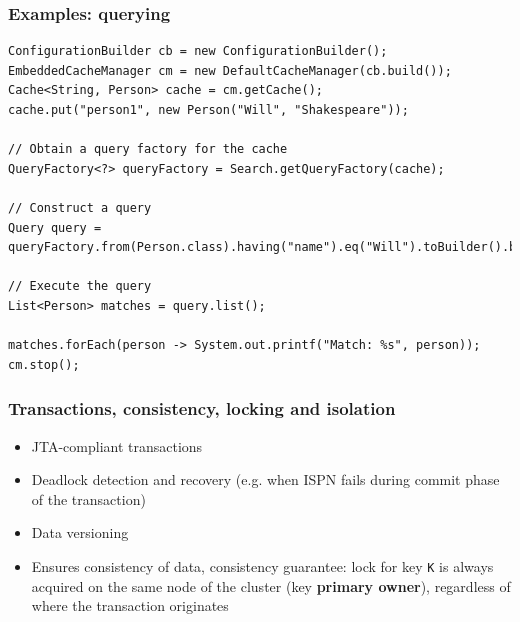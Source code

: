 \documentclass[10pt,utf8]{beamer}
\begin{document}
\begin{frame}[fragile]
	\frametitle{Examples: querying}
		\begin{lstlisting}[style=Java]
ConfigurationBuilder cb = new ConfigurationBuilder();
EmbeddedCacheManager cm = new DefaultCacheManager(cb.build());
Cache<String, Person> cache = cm.getCache();
cache.put("person1", new Person("Will", "Shakespeare"));

// Obtain a query factory for the cache
QueryFactory<?> queryFactory = Search.getQueryFactory(cache);

// Construct a query
Query query = queryFactory.from(Person.class).having("name").eq("Will").toBuilder().build();
      
// Execute the query
List<Person> matches = query.list();

matches.forEach(person -> System.out.printf("Match: %s", person));
cm.stop();
	\end{lstlisting}
\end{frame}

\begin{frame}
	\frametitle{Transactions, consistency, locking and isolation}
	\begin{itemize}
		\item JTA-compliant transactions
		\item Deadlock detection and recovery (e.g. when ISPN fails during commit phase of the transaction)
		\item Data versioning
		\item Ensures consistency of data, consistency guarantee: 
		lock for key \texttt{K} is always acquired on the same node of the cluster (key \textbf{primary owner}), regardless of where the transaction originates
	\end{itemize}
\end{frame}
\end{document}
